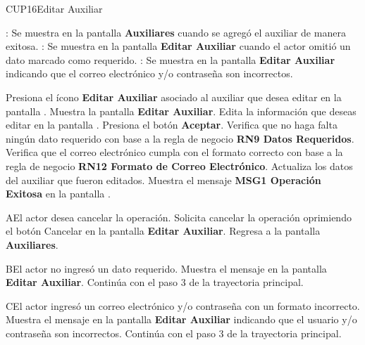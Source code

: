 \begin{UseCase}{CUP16}{Editar Auxiliar}
{\begin{UClist}
	    \UCli {}: Se muestra en la pantalla \textbf{Auxiliares} cuando se agregó el auxiliar de manera exitosa.
	    \UCli {}: Se muestra en la pantalla \textbf{Editar Auxiliar} cuando el actor omitió un dato marcado como requerido.
	    \UCli {}: Se muestra en la pantalla \textbf{Editar Auxiliar} indicando que el correo electrónico y/o contraseña son incorrectos.
		
	    \end{UClist}
	}
 \end{UseCase}

 \begin{UCtrayectoria}
 	
 	\UCpaso [\UCactor] Presiona el ícono \textbf{Editar Auxiliar} asociado al auxiliar que desea editar en la pantalla .
 	\UCpaso Muestra la pantalla \textbf{Editar Auxiliar}.
 	\UCpaso [\UCactor] Edita la información que deseas editar en la pantalla .
 	\UCpaso [\UCactor] Presiona el botón \textbf{Aceptar}.
 	\UCpaso Verifica que no haga falta ningún dato requerido con base a la regla de negocio \textbf{RN9 Datos Requeridos}.
 	\UCpaso Verifica que el correo electrónico cumpla con el formato correcto con base a la regla de negocio \textbf{RN12 Formato de Correo Electrónico}.
 	\UCpaso Actualiza los datos del auxiliar que fueron editados.
 	\UCpaso Muestra el mensaje \textbf{MSG1 Operación Exitosa} en la pantalla .
 	   
 \end{UCtrayectoria}

 \begin{UCtrayectoriaA}{A}{El actor desea cancelar la operación.}
	\UCpaso[\UCactor] Solicita cancelar la operación oprimiendo el botón Cancelar en la pantalla \textbf{Editar Auxiliar}.
	\UCpaso Regresa a la pantalla \textbf{Auxiliares}.
\end{UCtrayectoriaA}

\begin{UCtrayectoriaA}{B}{El actor no ingresó un dato requerido.}
	\UCpaso Muestra el mensaje  en la pantalla \textbf{Editar Auxiliar}.
	\UCpaso Continúa con el paso 3 de la trayectoria principal.
\end{UCtrayectoriaA}

\begin{UCtrayectoriaA}{C}{El actor ingresó un correo electrónico y/o contraseña con un formato incorrecto.}
	\UCpaso Muestra el mensaje  en la pantalla \textbf{Editar Auxiliar} indicando que el usuario y/o contraseña son incorrectos.
	\UCpaso Continúa con el paso 3 de la trayectoria principal.
\end{UCtrayectoriaA} 
